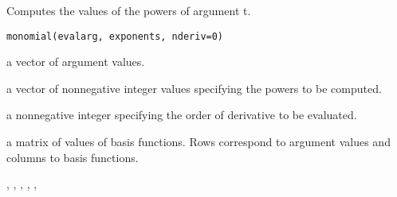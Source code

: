 \begin{Description}\relax
Computes the values of the powers of argument t.
\end{Description}
\begin{Usage}
\begin{verbatim}
monomial(evalarg, exponents, nderiv=0)
\end{verbatim}
\end{Usage}
\begin{Arguments}
\begin{ldescription}
\item[\code{evalarg}] a vector of argument values.

\item[\code{exponents}] a vector of nonnegative integer values specifying the
powers to be computed.

\item[\code{nderiv}] a nonnegative integer specifying the order of derivative to be
evaluated.

\end{ldescription}
\end{Arguments}
\begin{Value}
a matrix of values of basis functions.  Rows correspond to
argument values and columns to basis functions.
\end{Value}
\begin{SeeAlso}\relax
{}, 
, 
, 
, 
, 
\end{SeeAlso}
\begin{Examples}
\end{Examples}


